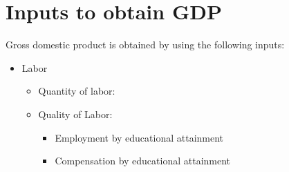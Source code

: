 \documentclass[
  ignorenonframetext,
]{beamer}
\providecommand{\tightlist}{%
  \setlength{\itemsep}{0pt}\setlength{\parskip}{0pt}}\usepackage{longtable,booktabs,array}
\begin{document}
\section{Inputs to obtain GDP}\label{inputs-to-obtain-gdp}

\begin{frame}{}
\label{section-10}
Gross domestic product is obtained by using the following inputs:

\begin{itemize}
\item
  Labor

  \begin{itemize}
  \tightlist
  \item
    Quantity of labor:

  \item
    Quality of Labor:

    \begin{itemize}
    \tightlist
    \item
      Employment by educational attainment
    \item
      Compensation by educational attainment
    \end{itemize}
  \end{itemize}
\end{itemize}
\end{frame}
\end{document}

